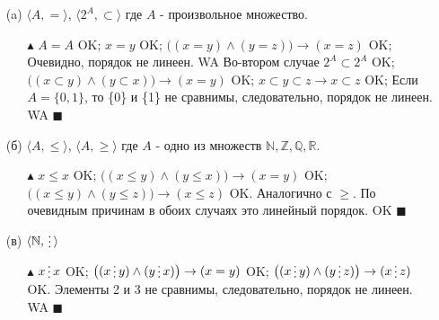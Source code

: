 \begin{enumerate}
    \item[(a)] $\langle A, = \rangle$, $\langle 2^A, \subset \rangle$ где $A$ - произвольное множество.
    \begin{itemize}
        \item[$\blacktriangle$] $A=A$ {\color{ForestGreen}OK}; \quad $x=y$ {\color{ForestGreen}OK}; \quad $\big((x=y) \land (y=z)\big) \to (x=z)$ {\color{ForestGreen}OK}; \quad Очевидно, порядок не линеен. {\color{Red}WA}
        \newline Во-втором случае $2^A \subset 2^A$ {\color{ForestGreen}OK}; \quad $\big((x \subset y) \land (y \subset x)\big) \to (x = y)$ {\color{ForestGreen}OK}; \quad $x \subset y \subset z \to x \subset z$ {\color{ForestGreen}OK}; 
        \newline Если $A=\{0,1\}$, то \{0\} и \{1\} не сравнимы, следовательно, порядок не линеен. {\color{Red}WA} $\blacksquare$
    \end{itemize}
    
    \item[(б)] $\langle A, \leq \rangle$, $\langle A, \geq \rangle$ где $A$ - одно из множеств $\mathbb{N,Z,Q,R}$.
    \begin{itemize}
        \item[$\blacktriangle$] $x \leq x$ {\color{ForestGreen}OK}; \quad $\big((x \leq y) \land (y \leq x)\big) \to (x = y)$ {\color{ForestGreen}OK}; \quad $\big((x \leq y) \land (y \leq z)\big) \to (x \leq z)$ {\color{ForestGreen}OK}.
        \newline Аналогично с $\geq$. По очевидным причинам в обоих случаях это линейный порядок. {\color{ForestGreen}OK}  $\blacksquare$
    \end{itemize}
    
    \item[(в)] $\langle \mathbb{N}, \svdots \rangle$
    \begin{itemize}
        \item[$\blacktriangle$] $x \svdots x$ {\color{ForestGreen}OK}; \quad $\big((x \svdots y) \land (y \svdots x)\big) \to (x = y)$ {\color{ForestGreen}OK}; \quad $\big((x \svdots y) \land (y \svdots z)\big) \to (x \svdots z)$ {\color{ForestGreen}OK}.
        \newline Элементы 2 и 3 не сравнимы, следовательно, порядок не линеен. {\color{Red}WA} $\blacksquare$
    \end{itemize}
    

\end{enumerate}
